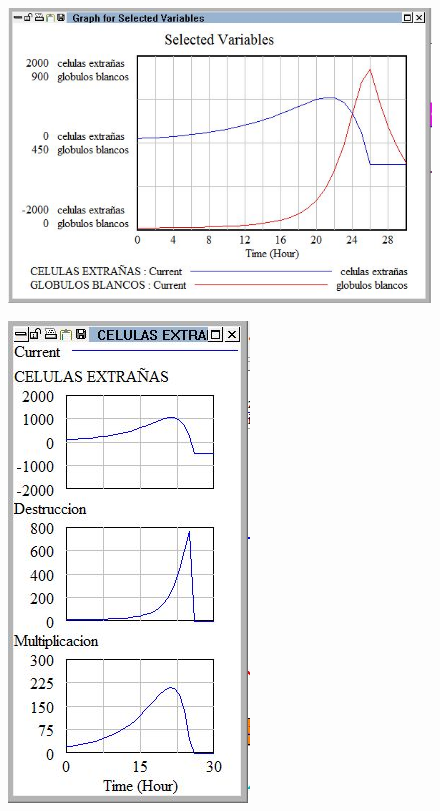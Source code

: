 \documentclass[12pt,letterpaper]{article}
\begin{document}
\begin{figure}
\centering
\begin{minipage}{.5\textwidth}
  \centering
  \includegraphics[width=1\linewidth]{4.jpg}
  \label{fig:test1}
\end{minipage}%
\begin{minipage}{.5\textwidth}
  \centering
  \includegraphics[width=.7\linewidth]{5.jpg}
  \label{fig:test2}
\end{minipage}
\end{figure}
\end{document}
